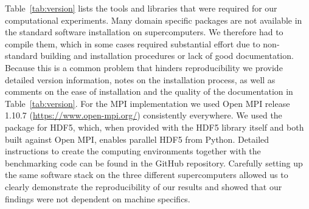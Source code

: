 Table~\ref{tab:version} lists the tools and libraries that were required for our computational experiments.  Many domain specific packages are not available in the standard software installation on supercomputers.
We therefore had to compile them, which in some cases required substantial effort due to non-standard building and installation procedures or lack of good documentation.
Because this is a common problem that hinders reproducibility we provide detailed version information, notes on the installation process, as well as comments on the ease of installation and the quality of the documentation in Table~\ref{tab:version}.
For the MPI implementation we used Open MPI release 1.10.7  (\url{https://www.open-mpi.org/}) consistently everywhere.
We used the  package for HDF5, which, when provided with the HDF5 library itself and  both built against Open MPI, enables parallel HDF5 from Python.
Detailed instructions to create the computing environments together with the benchmarking code can be found in the GitHub repository.
Carefully setting up the same software stack on the three different supercomputers allowed us to clearly demonstrate the reproducibility of our results and showed that our findings were not dependent on machine specifics.


